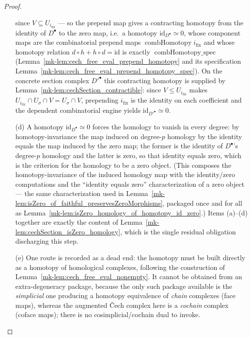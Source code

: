 \begin{proof}
\begin{enumerate}
      since \(V \subseteq U_{i_{\mathrm{fix}}}\) --- so the prepend map gives a contracting homotopy from the
      identity of \(D^\bullet\) to the zero map, i.e.\ a homotopy \(\mathrm{id}_{D^\bullet} \simeq 0\), whose
      component maps are the combinatorial prepend maps \(\operatorname{combHomotopy} i_{\mathrm{fix}}\) and
      whose homotopy relation \(d \circ h + h \circ d = \mathrm{id}\) is exactly
      \(\operatorname{combHomotopy\_spec}\) (Lemma~\ref{mk-lem:cech_free_eval_prepend_homotopy} and its
      specification Lemma~\ref{mk-lem:cech_free_eval_prepend_homotopy_spec}). On the concrete section complex
      \(D'^\bullet\) this contracting homotopy is supplied by Lemma~\ref{mk-lem:cechSection_contractible}:
      since \(V \le U_{i_{\mathrm{fix}}}\) makes \(U_{i_{\mathrm{fix}}} \cap U_\sigma \cap V = U_\sigma \cap
      V\), prepending \(i_{\mathrm{fix}}\) is the identity on each coefficient and the dependent
      combinatorial engine yields \(\mathrm{id}_{D'^\bullet} \simeq 0\).
    \item[(d)] A homotopy \(\mathrm{id}_{D^\bullet} \simeq 0\) forces the homology to vanish in every degree:
      by homotopy-invariance the map induced on degree-\(p\) homology by the identity equals the map induced
      by the zero map; the former is the identity of \(D^\bullet\)'s degree-\(p\) homology and the latter is
      zero, so that identity equals zero, which is the criterion for the homology to be a zero object. (This
      composes the homotopy-invariance of the induced homology map with the identity/zero computations and
      the ``identity equals zero'' characterization of a zero object --- the same characterization used in
      Lemma~\ref{mk-lem:isZero_of_faithful_preservesZeroMorphisms}, packaged once and for all as
      Lemma~\ref{mk-lem:isZero_homology_of_homotopy_id_zero}.) Items (a)--(d) together are exactly the content
      of Lemma~\ref{mk-lem:cechSection_isZero_homology}, which is the single residual obligation discharging
      this step.
    \item[(e)] One route is recorded as a dead end: the homotopy must be built directly as a homotopy of
      homological complexes, following the construction of
      Lemma~\ref{mk-lem:cech_free_eval_nonempty}. It cannot be obtained from an extra-degeneracy package,
      because the only such package available is the \emph{simplicial} one producing a homotopy equivalence
      of \emph{chain} complexes (face maps), whereas the augmented {\v C}ech complex here is a \emph{cochain}
      complex (coface maps); there is no cosimplicial/cochain dual to invoke.
  \end{enumerate}


\end{proof}
